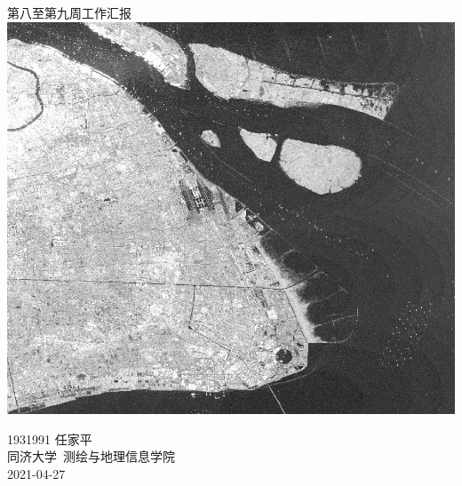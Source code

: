 \documentclass[a4paper, 12pt]{article}
\begin{document}

\begin{center}
    {\Huge 
        第八至第九周工作汇报}\\[20pt]
    
    \includegraphics[scale=0.6]{pic/cover.jpg}  

    {\Large 
        1931991 任家平\\[12pt]
        同济大学~测绘与地理信息学院\\[12pt]
        2021-04-27}
\end{center}
\thispagestyle{empty}



\newpage
{}
\tableofcontents
\newpage
{}




\listoffigures
{}
\listoftables
{}
\newpage
\nocite{*}


\end{document}
